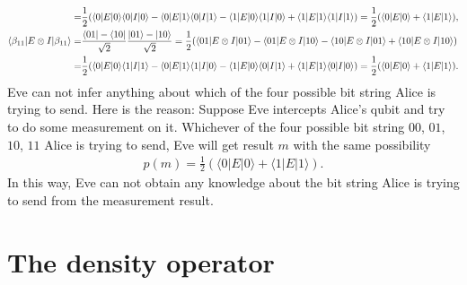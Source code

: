 \documentclass[en]{sol-man}
\begin{document}
\begin{pf}
\begin{align}
        =&\frac{1}{2}(\langle 0\rvert E\lvert 0\rangle\langle 0\rvert I\lvert 0\rangle-\langle 0\rvert E\lvert 1\rangle\langle 0\rvert I\lvert 1\rangle-\langle 1\rvert E\lvert 0\rangle\langle 1\rvert I\lvert 0\rangle+\langle 1\rvert E\lvert 1\rangle\langle 1\rvert I\lvert 1\rangle)=\frac{1}{2}(\langle 0\rvert E\lvert 0\rangle+\langle 1\rvert E\lvert 1\rangle),\\
        \notag\langle\beta_{11}\rvert E\otimes I\lvert\beta_{11}\rangle=&\frac{\langle 01\rvert-\langle 10\rvert}{\sqrt{2}}\frac{\lvert 01\rangle-\lvert 10\rangle}{\sqrt{2}}=\frac{1}{2}(\langle 01\rvert E\otimes I\lvert 01\rangle-\langle 01\rvert E\otimes I\lvert 10\rangle-\langle 10\rvert E\otimes I\lvert 01\rangle+\langle 10\rvert E\otimes I\lvert 10\rangle)\\
        =&\frac{1}{2}(\langle 0\rvert E\lvert 0\rangle\langle 1\rvert I\lvert 1\rangle-\langle 0\rvert E\lvert 1\rangle\langle 1\rvert I\lvert 0\rangle-\langle 1\rvert E\lvert 0\rangle\langle 0\rvert I\lvert 1\rangle+\langle 1\rvert E\lvert 1\rangle\langle 0\rvert I\lvert 0\rangle)=\frac{1}{2}(\langle 0\rvert E\lvert 0\rangle+\langle 1\rvert E\lvert 1\rangle).
    \end{align}
    Eve can not infer anything about which of the four possible bit string Alice is trying to send. Here is the reason:
    Suppose Eve intercepts Alice's qubit and try to do some measurement on it. Whichever of the four possible bit string $00$, $01$, $10$, $11$ Alice is trying to send, Eve will get result $m$ with the same possibility
    \begin{align}
        p(m)=\frac{1}{2}(\langle 0\rvert E\lvert 0\rangle+\langle 1\rvert E\lvert 1\rangle).
    \end{align}
    In this way, Eve can not obtain any knowledge about the bit string Alice is trying to send from the measurement result.
\end{pf}

\section{The density operator}
\end{document}
